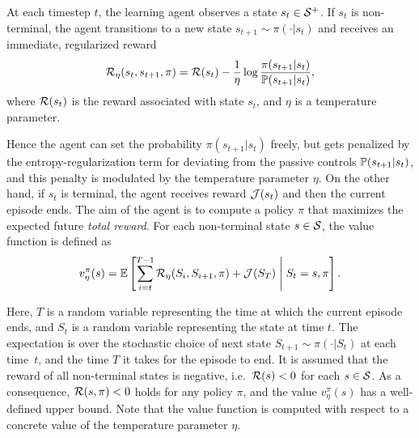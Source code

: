 At each timestep $t$, the learning agent observes a state $s_t\in\mathcal{S}^+$. If $s_t$ is non-terminal, the agent transitions to a new state $s_{t+1}\sim\pi(\cdot|s_t)$ and receives an immediate, regularized reward
\begin{equation*}
  \mathcal{R}_\eta(s_t, s_{t+1},\pi) = \mathcal{R}(s_t) - \frac 1 \eta \log \frac {\pi(s_{t+1}|s_t)} {\mathbb{P}(s_{t+1}|s_t)},
\end{equation*}
where $\mathcal{R}(s_t)$ is the reward associated with state $s_t$, and $\eta$ is a temperature parameter. 

Hence the agent can set the probability $\pi(s_{t+1}|s_t)$ freely, but gets penalized by the entropy-regularization term for deviating from the passive controls $\mathbb{P}(s_{t+1}|s_t)$, and this penalty is modulated by the temperature parameter $\eta$. On the other hand, if $s_t$ is terminal, the agent receives reward $\mathcal{J}(s_t)$ and then the current episode ends. The aim of the agent is to compute a policy $\pi$ that maximizes the expected future \textit{total reward}. For each non-terminal state $s\in\mathcal{S}$, the value function is defined as
\begin{equation*}
  v^\pi_\eta(s) = \mathbb{E}\left[\sum_{i=t}^{T-1} \mathcal{R}_\eta(S_i, S_{i+1},\pi) + \mathcal{J}(S_T)\;\middle\lvert\;S_t = s, \pi\right].
\end{equation*}

Here, $T$ is a random variable representing the time at which the current episode ends, and $S_t$ is a random variable representing the state at time $t$. The expectation is over the stochastic choice of next state $S_{t+1}\sim\pi(\cdot|S_t)$ at each time~$t$, and the time $T$ it takes for the episode to end. It is assumed that the reward of all non-terminal states is negative, i.e.~$\mathcal{R}(s)<0$ for each $s\in\mathcal{S}$. As a consequence, $\mathcal{R}(s,\pi)<0$ holds for any policy $\pi$, and the value $v^\pi_\eta(s)$ has a well-defined upper bound. Note that the value function is computed with respect to a concrete value of the temperature parameter $\eta$.  


